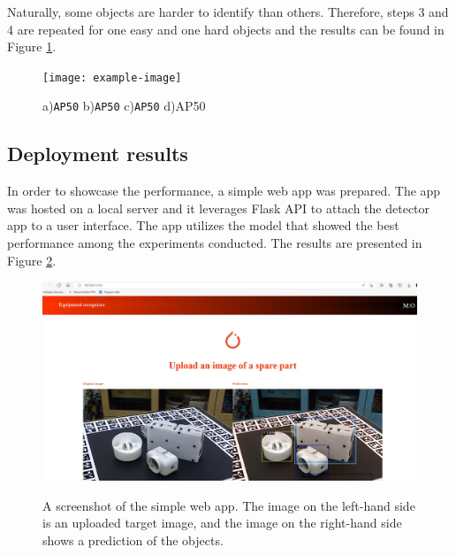 \documentclass[english, 12pt, a4paper, elec, utf8, a-1b, online]{aaltothesis}
\begin{document}
Naturally, some objects are harder to identify than others. Therefore, steps 3 and 4 are repeated for one easy and one hard objects and the results can be found in Figure \ref{myModel_continuous_experiment_2}.

\begin{figure}[htb]
	\begin{center}
		\texttt{[image: example-image]}
	\end{center}
	\caption{a)\texttt{AP50} b)\texttt{AP50} c)\texttt{AP50} d)AP50}
	\begin{center}
		\label{myModel_continuous_experiment_2}
	\end{center}
\end{figure}
\FloatBarrier  



\subsection{Deployment results}
In order to showcase the performance, a simple web app was prepared. The app was hosted on a local server and it leverages Flask API to attach the detector app to a user interface. The app utilizes the model  that showed the best performance among the experiments conducted. The results are presented in Figure \ref{demo}. 

\begin{figure}[htb]
	\begin{center}
		\includegraphics[width=14cm]{./demo.png}
	\end{center}
	\caption{A screenshot of the simple web app. The image on the left-hand side is an uploaded target image, and the image on the right-hand side shows a prediction of the objects.}
	\begin{center}
		\label{demo}
	\end{center}
\end{figure}
\end{document}
